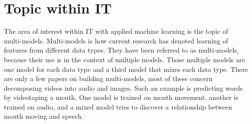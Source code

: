 \chapter{Topic within IT}

The area of interest within IT with applied machine learning is the topic of multi-models.  Multi-models is how current research has denoted learning of features from different data types.  They have been referred to as multi-models, because their use is in the context of multiple models.  Those multiple models are one model for each data type and a third model that mixes each data type. There are only a few papers on building multi-models, most of these concern decomposing videos into audio and images.  Such an example is predicting words by videotaping a mouth.  One model is trained on mouth movement, another is trained on audio, and a mixed model tries to discover a relationship between mouth moving and speech.  

